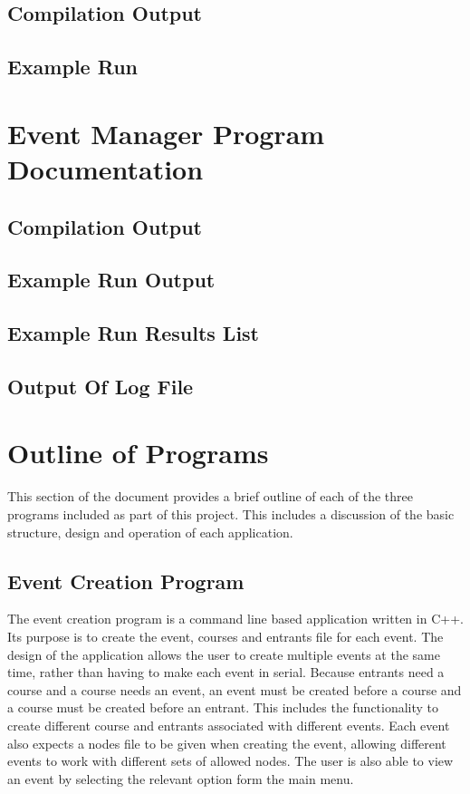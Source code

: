 \documentclass{article}
\begin{document}


\subsection{Compilation Output}

\subsection{Example Run}

\section{Event Manager Program Documentation}

\subsection{Compilation Output}

\subsection{Example Run Output}

\subsection{Example Run Results List}

\subsection{Output Of Log File}

\section{Outline of Programs}
This section of the document provides a brief outline of each of the three programs included as part of this project. This includes a discussion of the basic structure, design and operation of each application.

\subsection{Event Creation Program}
The event creation program is a command line based application written in C++. Its purpose is to create the event, courses and entrants file for each event. The design of the application allows the user to create multiple events at the same time, rather than having to make each event in serial. Because entrants need a course and a course needs an event, an event must be created before a course and a course must be created before an entrant. This includes the functionality to create different course and entrants associated with different events. Each event also expects a nodes file to be given when creating the event, allowing different events to work with different sets of allowed nodes. The user is also able to view an event by selecting the relevant option form the main menu.
\end{document}

